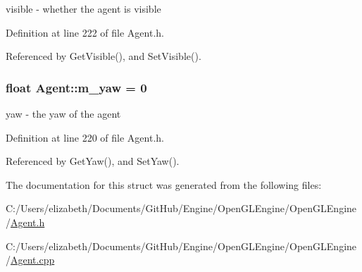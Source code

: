 visible -\/ whether the agent is visible 



Definition at line 222 of file Agent.\+h.



Referenced by Get\+Visible(), and Set\+Visible().

\subsubsection[{\texorpdfstring{m\+\_\+yaw}{m_yaw}}]{\setlength{\rightskip}{0pt plus 5cm}float Agent\+::m\+\_\+yaw = 0\hspace{0.3cm}{\ttfamily [protected]}}\hypertarget{struct_agent_ab247e82de72e83d05afea649311a9314}{}\label{struct_agent_ab247e82de72e83d05afea649311a9314}


yaw -\/ the yaw of the agent 



Definition at line 220 of file Agent.\+h.



Referenced by Get\+Yaw(), and Set\+Yaw().



The documentation for this struct was generated from the following files\+:\begin{DoxyCompactItemize}
\item 
C\+:/\+Users/elizabeth/\+Documents/\+Git\+Hub/\+Engine/\+Open\+G\+L\+Engine/\+Open\+G\+L\+Engine/\hyperlink{_agent_8h}{Agent.\+h}\item 
C\+:/\+Users/elizabeth/\+Documents/\+Git\+Hub/\+Engine/\+Open\+G\+L\+Engine/\+Open\+G\+L\+Engine/\hyperlink{_agent_8cpp}{Agent.\+cpp}\end{DoxyCompactItemize}
